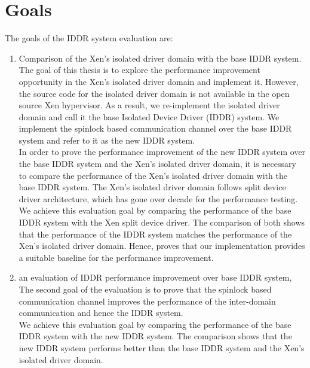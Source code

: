 \section{Goals}
\label{sec:goals}
The goals of the IDDR system evaluation are:
\begin{enumerate}
\item Comparison of the Xen's isolated driver domain with the base IDDR system.
\\[3mm]
The goal of this thesis is to explore the performance improvement opportunity in the Xen's isolated driver domain and implement it. However, the source code for the isolated driver domain is not available in the open source Xen hypervisor. As a result, we re-implement the isolated driver domain and call it the base Isolated Device Driver (IDDR) system. We implement the spinlock based communication channel over the base IDDR system and refer to it as the new IDDR system.
\\[3mm]
In order to prove the performance improvement of the new IDDR system over the base IDDR system and the Xen's isolated driver domain, it is necessary to compare the performance of the Xen's isolated driver domain with the base IDDR system. The Xen's isolated driver domain follows split device driver architecture, which has gone over decade for the performance testing. We achieve this evaluation goal by comparing the performance of the base IDDR system with the Xen split device driver. The comparison of both shows that the performance of the IDDR system matches the performance of the Xen's isolated driver domain. Hence, proves that our implementation provides a suitable baseline for the performance improvement.

\item an evaluation of IDDR performance improvement over base IDDR system,
\\[3mm] 
The second goal of the evaluation is to prove that the spinlock based communication channel improves the performance of the inter-domain communication and hence the IDDR system.
\\[3mm]
We achieve this evaluation goal by comparing the performance of the base IDDR system with the new IDDR system. The comparison shows that the new IDDR system performs better than the base IDDR system and the Xen's isolated driver domain.
\end{enumerate}


